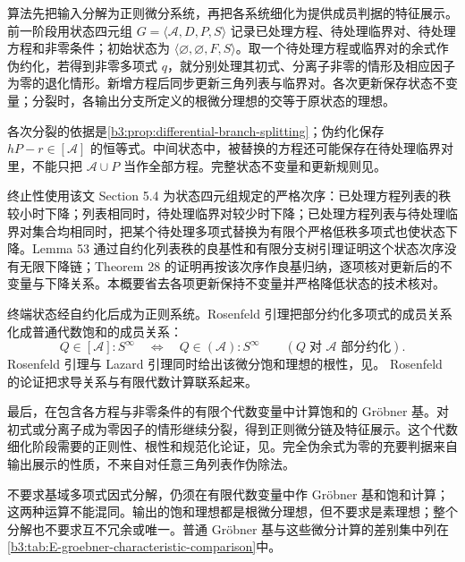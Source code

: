 \begin{proofsketch}
	算法先把输入分解为正则微分系统，再把各系统细化为提供成员判据的特征展示。前一阶段用状态四元组 \(G=\langle\mathcal A,D,P,S\rangle\) 记录已处理方程、待处理临界对、待处理方程和非零条件；初始状态为 \(\langle\varnothing,\varnothing,F,S\rangle\)。取一个待处理方程或临界对的余式作伪约化，若得到非零多项式 \(q\)，就分别处理其初式、分离子非零的情形及相应因子为零的退化情形。新增方程后同步更新三角列表与临界对。各次更新保存状态不变量；分裂时，各输出分支所定义的根微分理想的交等于原状态的理想。

	各次分裂的依据是\cref{b3:prop:differential-branch-splitting}；伪约化保存 \(hP-r\in[\mathcal A]\) 的恒等式。中间状态中，被替换的方程还可能保存在待处理临界对里，不能只把 \(\mathcal A\cup P\) 当作全部方程。完整状态不变量和更新规则见\cite[Sections 5.1--5.3]{BoulierLazardOllivierPetitot2009DifferentialIdeals}。

	终止性使用该文 Section 5.4 为状态四元组规定的严格次序：已处理方程列表的秩较小时下降；列表相同时，待处理临界对较少时下降；已处理方程列表与待处理临界对集合均相同时，把某个待处理多项式替换为有限个严格低秩多项式也使状态下降。Lemma 53 通过自约化列表秩的良基性和有限分支树引理证明这个状态次序没有无限下降链；Theorem 28 的证明再按该次序作良基归纳，逐项核对更新后的不变量与下降关系。本概要省去各项更新保持不变量并严格降低状态的技术核对。

	终端状态经自约化后成为正则系统。Rosenfeld 引理把部分约化多项式的成员关系化成普通代数饱和的成员关系：
	\[
		Q\in[\mathcal A]:S^\infty \quad\Longleftrightarrow\quad Q\in(\mathcal A):S^\infty \qquad(Q\;\text{对 \(\mathcal A\) 部分约化}).
	\]
	Rosenfeld 引理与 Lazard 引理同时给出该微分饱和理想的根性，见\cite[Theorems 23 and 25]{BoulierLazardOllivierPetitot2009DifferentialIdeals}。 Rosenfeld 的论证把求导关系与有限代数计算联系起来。

	最后，在包含各方程与非零条件的有限个代数变量中计算饱和的 Gröbner 基。对初式或分离子成为零因子的情形继续分裂，得到正则微分链及特征展示。这个代数细化阶段需要的正则性、根性和规范化论证，见\cite[Section 6.1, Lemmas 57--58 and Theorem 59]{BoulierLazardOllivierPetitot2009DifferentialIdeals}。完全伪余式为零的充要判据来自输出展示的性质，不来自对任意三角列表作伪除法。
\end{proofsketch}

不要求基域多项式因式分解，仍须在有限代数变量中作 Gröbner 基和饱和计算；这两种运算不能混同。输出的饱和理想都是根微分理想，但不要求是素理想；整个分解也不要求互不冗余或唯一。普通 Gröbner 基与这些微分计算的差别集中列在\cref{b3:tab:E-groebner-characteristic-comparison}中。

